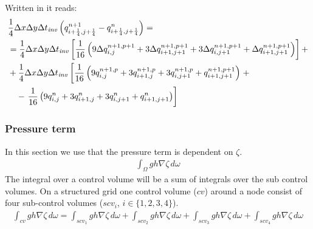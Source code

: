 Written in \deltaformulation  it reads:
\begin{align}
    &\frac{1}{4}\Delta x\Delta y\Delta t_{\it{inv}} \left( q^{n+1}_{i+\frac{1}{4}, j+\frac{1}{4}} -  q^{n}_{i+\frac{1}{4}, j+\frac{1}{4}} \right) =
    \nonumber \\*
    &=\frac{1}{4}\Delta x\Delta y\Delta t_{\it{inv}} \left[ \frac{1}{16}\left( 9 \Delta q^{n+1,p+1}_{i, j} + 3 \Delta q^{n+1,p+1}_{i+1,j+1}  + 3 \Delta q^{n+1,p+1}_{i, j+1} + \Delta q^{n+1,p+1}_{i+1, j+1}\right) \right] +
    \nonumber \\*
    & + \frac{1}{4}\Delta x\Delta y\Delta t_{\it{inv}} \left[ \frac{1}{16}\left( 9 q^{n+1,p}_{i, j} + 3 q^{n+1,p}_{i+1,j}  + 3 q^{n+1,p}_{i, j+1} + q^{n+1,p+1}_{i+1, j+1}\right) \right. +
    \nonumber \\*
    &\quad - \left. \frac{1}{16}\left( 9 q^{n}_{i, j} +  3 q^{n}_{i+1,j}  + 3  q^{n}_{i, j+1} + q^{n}_{i+1, j+1}\right)\right]
\end{align}
\subsubsection{Pressure term} \label{sec:linearized_pressure_zeta}
In this section we use that the pressure term is dependent on $\zeta$.
\begin{align}
    \int_{\Omega} gh \nabla \zeta \, d\omega
\end{align}
The integral over a control volume will be a sum of integrals over the sub control volumes.
On a structured grid one control volume ($cv$) around a node consist of four sub-control volumes ($scv_i$, $i\in\{1,2,3,4\}$).
\begin{align}
    \int_{cv}    gh \nabla \zeta\, d\omega =
    \int_{scv_1} gh \nabla \zeta\, d\omega +
    \int_{scv_2} gh \nabla \zeta\, d\omega +
    \int_{scv_3} gh \nabla \zeta\, d\omega +
    \int_{scv_4} gh \nabla \zeta\, d\omega
\end{align}


